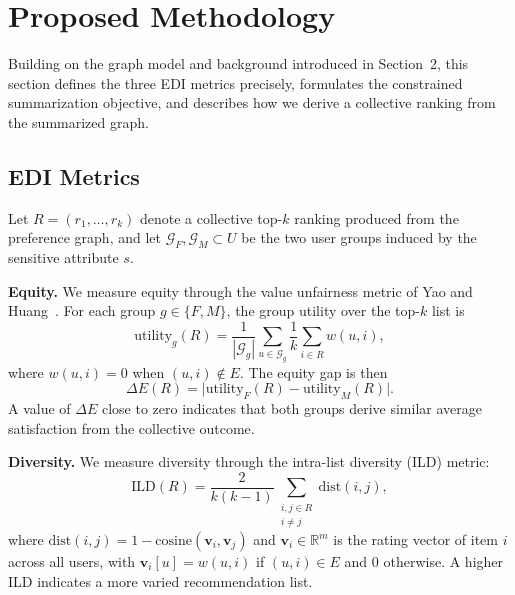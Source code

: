 \documentclass[a4paper,fleqn]{cas-dc}
\begin{document}
\section{Proposed Methodology}\label{sec:methodology}

Building on the graph model and background introduced in Section~2, this section
defines the three EDI metrics precisely, formulates the constrained summarization
objective, and describes how we derive a collective ranking from the summarized
graph.

\subsection{EDI Metrics}

Let $R = (r_1, \ldots, r_k)$ denote a collective top-$k$ ranking produced from
the preference graph, and let $\mathcal{G}_F, \mathcal{G}_M \subset U$ be the
two user groups induced by the sensitive attribute $s$.

\smallskip\noindent\textbf{Equity.}
We measure equity through the value unfairness metric of Yao and
Huang~\citeyearpar{yao_new_2017}. For each group $g \in \{F, M\}$, the group utility
over the top-$k$ list is
\begin{equation}
  \mathrm{utility}_g(R)
    = \frac{1}{|\mathcal{G}_g|}
      \sum_{u \in \mathcal{G}_g}
      \frac{1}{k} \sum_{i \in R} w(u, i),
\end{equation}
where $w(u,i)=0$ when $(u,i)\notin E$. The equity gap is then
\begin{equation}
  \Delta E(R) = \bigl|\mathrm{utility}_F(R) - \mathrm{utility}_M(R)\bigr|.
\end{equation}
A value of $\Delta E$ close to zero indicates that both groups derive similar
average satisfaction from the collective outcome.

\smallskip\noindent\textbf{Diversity.}
We measure diversity through the intra-list diversity (ILD) metric:
\begin{equation}
  \mathrm{ILD}(R) = \frac{2}{k(k-1)}
    \sum_{\substack{i,j \in R \\ i \neq j}} \mathrm{dist}(i,j),
\end{equation}
where $\mathrm{dist}(i,j) = 1 - \mathrm{cosine}(\mathbf{v}_i, \mathbf{v}_j)$
and $\mathbf{v}_i \in \mathbb{R}^m$ is the rating vector of item $i$ across all
users, with $\mathbf{v}_i[u] = w(u,i)$ if $(u,i)\in E$ and $0$ otherwise.
A higher ILD indicates a more varied recommendation list.
\end{document}
